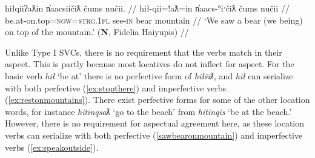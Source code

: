 \ex \label{ex:sawbearonmountain}
\begingl
\glpreamble hiłqiiʔaƛin n̓aacsiičiƛ čums nučii. //
\gla hił-qii=!aƛ=in n̓aacs-°iˑčiƛ čums nučii //
\glb be.at-on.top=\textsc{now}=\textsc{strg.1pl} see-\textsc{in} bear mountain //
\glft `We saw a bear (we being) on top of the mountain.' (\textbf{N}, Fidelia Haiyupis) //
\endgl
\xe

\begin{comment}
\ex~ \label{ex:hiddeninthewall}
\begingl
\glpreamble huptsaapckʷaƛ hinałc̓ił ʔiiḥmisukʔi p̓atquk. //
\gla hupt-saˑp=ckʷiˑ=!aƛ hina-ałc̓ił ʔiiḥmis=uk=ʔiˑ p̓atquk //
\glb hide-\textsc{mo.caus}=remains.of=\textsc{now} \textsc{empty}-in.wall important=\textsc{poss}=\textsc{art} belongings //
\glft `They hid their belongings in the walls.' (\textbf{B}, Bob Mundy) //
\endgl
\xe
\end{comment}

\begin{comment}
This ``interruption" can occur the other way around, when the location word is intransitive.

\ex \label{ex:gasolinebydoor}
\begingl
\glpreamble ḥuqšiƛ ʔucačiƛ ḥaa yaqʔiitq hiiłsʔat̓uus gasoline.\footnotemark //
\gla ḥuq-šiƛ ʔu-ca-čiƛ ḥaa yaq=ʔiˑtq hił-L.sʔat̓uus gasoline //
\glb tip.over-\textsc{mo} \textsc{x}-go-\textsc{mo} who.what=\textsc{defn.3} be.at-by.the.door gasoline //
\glft `It knocked the gasoline over toward the door..' (\textbf{C}, \textit{tupaat} Julia Lucas) //
\endgl
\xe

\footnotetext{In this dependent construction, `gasoline' is the participant of the predicative relativizer \textit{yaq} `who'. The bracketing is [ḥuqšiƛ ʔucačiƛ]\textsubscript{pred} [ḥaa [yaqʔiitq hiiłsʔat̓uus gasoline] ]\textsubscript{part}}
\end{comment}

Unlike Type I SVCs, there is no requirement that the verbs match in their aspect. This is partly because most locatives do not inflect for aspect. For the basic verb \textit{hił} `be at' there is no perfective form of \textit{hiłšiƛ}, and \textit{hił} can serialize with both perfective (\ref{ex:stopthere}) and imperfective verbs (\ref{ex:restonmountains}). There exist perfective forms for some of the other location words, for instance \textit{hitinqsaƛ} `go to the beach' from \textit{hitinqis} `be at the beach.' However, there is no requirement for aspectual agreement here, as these location verbs can serialize with both perfective (\ref{sawbearonmountain}) and imperfective verbs (\ref{ex:speakoutside}).

